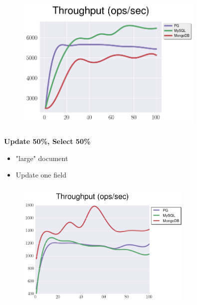 \documentclass[usenames,dvipsnames, 18pt, compress, aspectratio=169]{beamer}
\begin{document}
\begin{frame}
    \frametitle{}
    \begin{center}
    \vspace{10pt}
    \begin{figure}
        \includegraphics[width=0.8\textwidth,center]{benchmarks/update_btree_wal_size.png}
    \end{figure}
    \end{center}
\end{frame}

\begin{frame}
    \frametitle{}
    \begin{center}
        \textbf{Update 50\%, Select 50\%}
        \begin{itemize}[label={}]
            \item "large" document
            \item Update one field
        \end{itemize}
    \end{center}
\end{frame}

\begin{frame}
    \frametitle{}
    \begin{center}
    \begin{figure}
        \includegraphics[width=0.75\textwidth,center]{benchmarks/update_btree_large_throughput.png}
    \end{figure}
    \end{center}
\end{frame}
\end{document}
